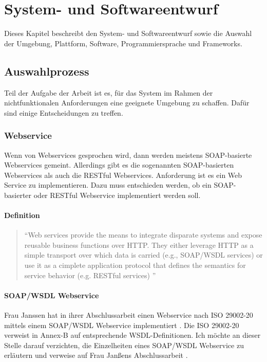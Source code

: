 \chapter{System- und Softwareentwurf} \label{kap:systemundsoftwarentwurf}


Dieses Kapitel beschreibt den System- und Softwareentwurf sowie die Auswahl der Umgebung, Plattform, Software, Programmiersprache und Frameworks.

\section{Auswahlprozess}

Teil der Aufgabe der Arbeit ist es, für das System im Rahmen der nichtfunktionalen Anforderungen eine geeignete Umgebung zu schaffen. Dafür sind einige Entscheidungen zu treffen. 

\subsection{Webservice}\label{sec:webservice}
Wenn von Webservices gesprochen wird, dann werden meistens \gls{SOAP}-basierte Webservices gemeint. Allerdings gibt es die sogenannten \gls{SOAP}-basierten Webservices als auch die RESTful Webservices. Anforderung ist es ein Web Service zu implementieren. Dazu muss entschieden werden, ob ein \gls{SOAP}-basierter oder RESTful Webservice implementiert werden soll.  

\subsubsection{Definition}

\begin{quotation}
\enquote{Web services provide the means to integrate disparate systems and expose reusable business functions over HTTP. They either leverage HTTP as a simple transport over which data is carried (e.g., SOAP/\gls{WSDL} services) or use it as a cimplete application protocol that defines the semantics for service behavior (e.g. RESTful services) \citep[S. 2][]{robinsonService}}	
\end{quotation}

\subsubsection{SOAP/WSDL Webservice}
Frau Janssen hat in ihrer Abschlussarbeit einen Webservice nach ISO 29002-20 mittels einem SOAP/WSDL Webservice implementiert \citep[vgl.][]{janssen}. Die ISO 29002-20 verweist in Annex-B auf entsprechende WSDL-Definitionen. 
Ich möchte an dieser Stelle darauf verzichten, die Einzelheiten eines SOAP/WSDL Webservice zu erläutern und verweise auf Frau Janßens Abschlussarbeit \citep[vgl.][Kap. 3]{janssen}. 

